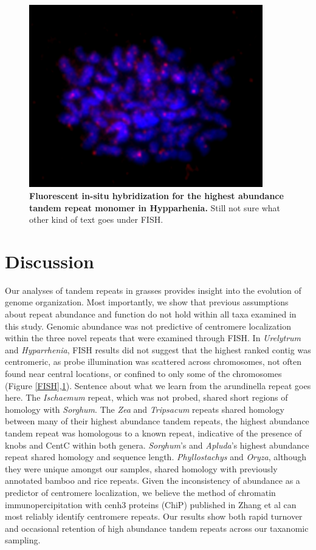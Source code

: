 \documentclass[10pt,letterpaper]{article}
\newcommand{\pb}[1]{\todo[size=\scriptsize, color=Bittersweet]{#1}} %
\begin{document}
\begin{figure}[h]
\begin{center}
\includegraphics[width=4in]{Hypdip_TK177-Repet.png}
\end{center}
\caption{{\bf Fluorescent in-situ hybridization for the highest abundance tandem repeat monomer in Hypparhenia.}
Still not sure what other kind of text goes under FISH.}
\label{FISH2}
\end{figure}

\section*{Discussion}

Our analyses of tandem repeats in grasses provides insight into the evolution of genome organization.
Most importantly, we show that previous assumptions about repeat abundance and function do not hold within all taxa examined in this study.
Genomic abundance was not predictive of centromere localization within the three novel repeats that were examined through FISH.
In \emph{Urelytrum} and \emph{Hyparrhenia}, FISH results did not suggest that the highest ranked contig was centromeric, as probe illumination was scattered across chromosomes, not often found near central locations, or confined to only some of the chromosomes (Figure \ref{FISH},\ref{FISH2}).
Sentence about what we learn from the arundinella repeat goes here.
The \emph{Ischaemum} repeat, which was not probed, shared short regions of homology with \emph{Sorghum}.
The \emph{Zea} and \emph{Tripsacum} repeats shared homology between many of their highest abundance tandem repeats, the highest abundance tandem repeat was homologous to a known repeat, indicative of the presence of knobs and CentC within both genera.
\emph{Sorghum}'s and \emph{Apluda}'s highest abundance repeat shared homology and sequence length. 
\emph{Phyllostachys} and \emph{Oryza}, although they were unique amongst our samples, shared homology with previously annotated bamboo and rice repeats.
Given the inconsistency of abundance as a predictor of centromere localization, we believe the method of chromatin immunopercipitation with cenh3 proteins (ChiP) published in Zhang et al \cite{zhang2014boom} can most reliably identify centromere repeats.
Our results show both rapid turnover and occasional retention of high abundance tandem repeats across our taxanomic sampling.
\end{document}
